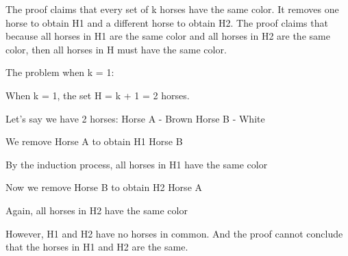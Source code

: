 The proof claims that every set of k horses have the same color. It removes one horse to obtain H1 and a different horse to obtain H2. The proof claims that because all horses in H1 are the same color and all horses in H2 are the same color, then all horses in H must have the same color.

The problem when k = 1:

When k = 1, the set H = k + 1 = 2 horses.

Let's say we have 2 horses:
Horse A - Brown
Horse B - White

We remove Horse A to obtain H1
{Horse B}

By the induction process, all horses in H1 have the same color

Now we remove Horse B to obtain H2
{Horse A}

Again, all horses in H2 have the same color

However, H1 and H2 have no horses in common. And the proof cannot conclude that the horses in H1 and H2 are the same.
